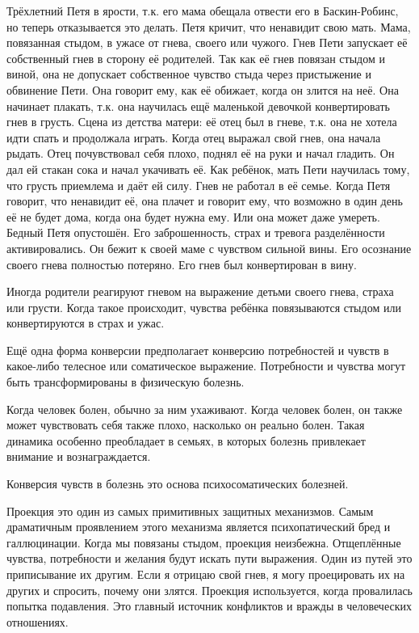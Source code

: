 \documentclass[10pt, fleqn]{article}
\begin{document}
Трёхлетний Петя в ярости, т.к. его мама обещала отвести его в Баскин-Робинс, но теперь отказывается это делать. Петя кричит, что ненавидит свою мать. Мама, повязанная стыдом, в ужасе от гнева, своего или чужого. Гнев Пети запускает её собственный гнев в сторону её родителей. Так как её гнев повязан стыдом и виной, она не допускает собственное чувство стыда через пристыжение и обвинение Пети.
Она говорит ему, как её обижает, когда он злится на неё. Она начинает плакать, т.к. она научилась ещё маленькой девочкой конвертировать гнев в грусть.
Сцена из детства матери: её отец был в гневе, т.к. она не хотела идти спать и продолжала играть. Когда отец выражал свой гнев, она начала рыдать. Отец почувствовал себя плохо, поднял её на руки и начал гладить. Он дал ей стакан сока и начал укачивать её. Как ребёнок, мать Пети научилась тому, что грусть приемлема и даёт ей силу. Гнев не работал в её семье. Когда Петя говорит, что ненавидит её, она плачет и говорит ему, что возможно в один день её не будет дома, когда она будет нужна ему. Или она может даже умереть.
Бедный Петя опустошён. Его заброшенность, страх и тревога разделённости активировались. Он бежит к своей маме с чувством сильной вины. Его осознание своего гнева полностью потеряно. Его гнев был конвертирован в вину.

Иногда родители реагируют гневом на выражение детьми своего гнева, страха или грусти. Когда такое происходит, чувства ребёнка повязываются стыдом или конвертируются в страх и ужас.



Ещё одна форма конверсии предполагает конверсию потребностей и чувств в какое-либо телесное или соматическое выражение. Потребности и чувства могут быть трансформированы в физическую болезнь.

Когда человек болен, обычно за ним ухаживают. Когда человек болен, он также может чувствовать себя также плохо, насколько он реально болен. Такая динамика особенно преобладает в семьях, в которых болезнь привлекает внимание и вознаграждается.

Конверсия чувств в болезнь это основа психосоматических болезней.


Проекция это один из самых примитивных защитных механизмов. Самым драматичным проявлением этого механизма является психопатический бред и галлюцинации. Когда мы повязаны стыдом, проекция неизбежна. Отщеплённые чувства, потребности и желания будут искать пути выражения.
Один из путей это приписывание их другим. Если я отрицаю свой гнев, я могу проецировать их на других и спросить, почему они злятся.
Проекция используется, когда провалилась попытка подавления. Это главный источник конфликтов и вражды в человеческих отношениях.
\end{document}
